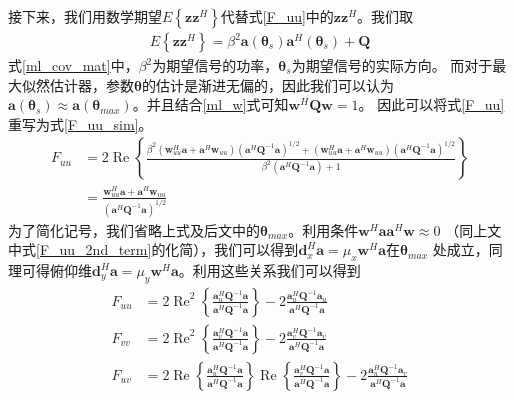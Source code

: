 \documentclass[master]{thesis-uestc}
\begin{document}
接下来，我们用数学期望$E\left\{\bm{z}\bm{z}^H\right\}$代替式\eqref{F_uu}中的$\bm{z}\bm{z}^H$。我们取
\begin{equation}\label{ml_cov_mat}
    \begin{aligned}
        E\left\{\bm{z}\bm{z}^H\right\} = \beta^2\bm{a}(\bm{\theta}_s)\bm{a}^H(\bm{\theta}_s) + \bm{Q}
    \end{aligned}
\end{equation}
式\eqref{ml_cov_mat}中，$\beta^2$为期望信号的功率，$\bm{\theta}_s$为期望信号的实际方向。
而对于最大似然估计器，参数$\bm{\theta}$的估计是渐进无偏的，因此我们可以认为
$\bm{a}(\bm{\theta}_s)\approx\bm{a}(\bm{\theta}_{max})$。并且结合\eqref{ml_w}式可知$\bm{w}^H\bm{Q}\bm{w}=1$。
因此可以将式\eqref{F_uu}重写为式\eqref{F_uu_sim}。
\begin{equation}\label{F_uu_sim}
    \begin{aligned}
        F_{uu} &= 2\operatorname{Re}\left\{
            \frac
            {
                \beta^2\left(\bm{w}^H_{uu}\bm{a}+\bm{a}^H\bm{w}_{uu}\right)
                \left(\bm{a}^H\bm{Q}^{-1}\bm{a}\right)^{1/2} +
                \left(\bm{w}^H_{uu}\bm{a}+\bm{a}^H\bm{w}_{uu}\right)\left(\bm{a}^H\bm{Q}^{-1}\bm{a}\right)^{1/2}
            }
            {
                \beta^2\left(\bm{a}^H\bm{Q}^{-1}\bm{a}\right) + 1
            }
        \right\} \\
        &= \frac{\bm{w}^H_{uu}\bm{a}+\bm{a}^H\bm{w}_{uu}}{\left(\bm{a}^H\bm{Q}^{-1}\bm{a}\right)^{1/2}}
    \end{aligned}
\end{equation}
为了简化记号，我们省略上式及后文中的$\bm{\theta}_{max}$。利用条件$\bm{w}^H\bm{a}\bm{a}^H\bm{w}\approx0$
（同上文中式\eqref{F_uu_2nd_term}的化简），我们可以得到$\bm{d}^H_x\bm{a}=\mu_x\bm{w}^H\bm{a}$在$\bm{\theta}_{max}$
处成立，同理可得俯仰维$\bm{d}^H_y\bm{a}=\mu_y\bm{w}^H\bm{a}$。利用这些关系我们可以得到
\begin{subequations}\label{lf_2deri_trans}
    \begin{align}
        F_{uu} &= 2\operatorname{Re}^2
        \left\{
            \frac{\bm{a}^H_u\bm{Q}^{-1}\bm{a}}{\bm{a}^H\bm{Q}^{-1}\bm{a}}
        \right\} - 
        2\frac{\bm{a}^H_u\bm{Q}^{-1}\bm{a}_u}{\bm{a}^H\bm{Q}^{-1}\bm{a}} \\
        F_{vv} &= 2\operatorname{Re}^2
        \left\{
            \frac{\bm{a}^H_v\bm{Q}^{-1}\bm{a}}{\bm{a}^H\bm{Q}^{-1}\bm{a}}
        \right\} - 
        2\frac{\bm{a}^H_v\bm{Q}^{-1}\bm{a}_v}{\bm{a}^H\bm{Q}^{-1}\bm{a}} \\
        F_{uv} &= 2\operatorname{Re}
        \left\{
            \frac{\bm{a}^H_u\bm{Q}^{-1}\bm{a}}{\bm{a}^H\bm{Q}^{-1}\bm{a}}
        \right\}
        \operatorname{Re}
        \left\{
            \frac{\bm{a}^H_v\bm{Q}^{-1}\bm{a}}{\bm{a}^H\bm{Q}^{-1}\bm{a}}
        \right\} - 
        2\frac{\bm{a}^H_u\bm{Q}^{-1}\bm{a}_v}{\bm{a}^H\bm{Q}^{-1}\bm{a}}
    \end{align}
\end{subequations}
\end{document}
